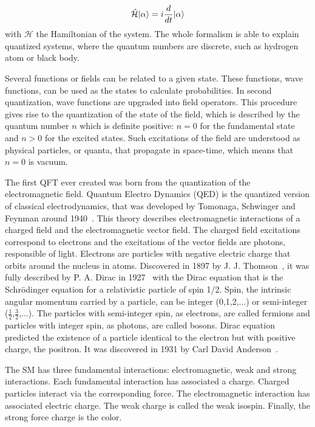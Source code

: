 \begin{equation}
  \label{eq:Schrodinger}
  \hat{\mathcal{H}}| \alpha\rangle=i\frac{d}{dt}| \alpha\rangle
\end{equation}with $\mathcal{H}$ the Hamiltonian of the system. The whole formalism is able to explain quantized systems, where the quantum numbers are discrete, such as hydrogen atom or black body.

Several functions or fields can be related to a given state. These functions, wave functions, can be used as the states to calculate probabilities. In second quantization, wave functions are upgraded into field operators. This procedure gives rise to the quantization of the state of the field, which is described by the quantum number $n$ which is definite positive: $n=0$ for the fundamental state and $n>0$ for the excited states. Such excitations of the field are understood as physical particles, or quanta, that propagate in space-time, which means that $n=0$ is vacuum. 

The first QFT ever created was born from the quantization of the electromagnetic field. Quantum Electro Dynamics (QED) is the quantized version of classical electrodynamics, that was developed by Tomonaga, Schwinger and Feynman around 1940~\cite{Tomonaga:1948zz, Schwinger:1948yk, Feynman:1948ur}. This theory describes electromagnetic interactions of a charged field and the electromagnetic vector field. The charged field excitations correspond to electrons and the excitations of the vector fields are photons, responsible of light. Electrons are particles with negative electric charge that orbits around the nucleus in atoms. Discovered in 1897 by J. J. Thomson~\cite{Griffiths:2008zz}, it was fully described by P. A. Dirac in 1927~\cite{Dirac:1927dy} with the Dirac equation that is the Schr\"{o}dinger equation for a relativistic particle of spin 1/2. Spin, the intrinsic angular momentum carried by a particle, can be integer (0,1,2,...) or semi-integer ($\frac{1}{2}$,$\frac{3}{2}$,...). The particles with semi-integer spin, as electrons, are called fermions and particles with integer spin, as photons, are called bosons. Dirac equation predicted the existence of a particle identical to the electron but with positive charge, the positron. It was discovered in 1931 by Carl David Anderson~\cite{Anderson:1933mb}.

The SM has three fundamental interactions: electromagnetic, weak and strong interactions. Each fundamental interaction has associated a charge. Charged particles interact via the corresponding force. The electromagnetic interaction has associated electric charge. The weak charge is called the weak isospin. Finally, the strong force charge is the color.

